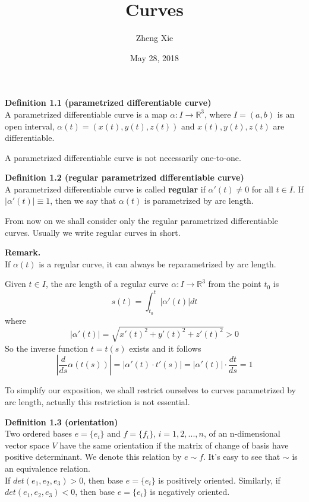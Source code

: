 \documentclass{article}
\author{Zheng Xie}
\title{Curves}
\date{May 28, 2018}
\begin{document}
\maketitle

\setlength\parindent{0em}   %
\setlength\parskip{1.0\baselineskip} %

\par
\textbf{Definition 1.1 (parametrized differentiable curve)}\\
A parametrized differentiable curve is a map $\alpha :I \to \mathbb R^3$, 
where $I = (a,b)$ is an open interval, $\alpha(t) = (x(t),y(t),z(t))$ and $x(t),y(t),z(t)$ are differentiable.

\par
A parametrized differentiable curve is not necessarily one-to-one.

\par
\textbf{Definition 1.2 (regular parametrized differentiable curve)}\\
A parametrized differentiable curve is called \textbf{regular} if $\alpha'(t) \neq 0$ for all $t \in I$.
If $|\alpha'(t)| \equiv 1$, then we say that $\alpha(t)$ is parametrized by arc length.

\par
From now on we shall consider only the regular parametrized differentiable curves.
Usually we write regular curves in short.

\par
\textbf{Remark.}\\
If $\alpha(t)$ is a regular curve, it can always be reparametrized by arc length.
\par
Given $t \in I$, the arc length of a regular curve $\alpha:I \to \mathbb R^3$ from the point $t_0$ is
$$
    s(t) = \int_{t_0}^t |{\alpha'(t)}|dt
$$
where
$$
    |{\alpha'(t)}| = \sqrt{x'(t)^2+y'(t)^2+z'(t)^2} > 0
$$
So the inverse function $t = t(s)$ exists and it follows
$$
    |\frac{d}{ds}\alpha(t(s))| = |\alpha'(t) \cdot t'(s)| = |\alpha'(t)| \cdot \frac{dt}{ds} = 1
$$

\par
To simplify our exposition, we shall restrict ourselves to curves parametrized by arc length, 
actually this restriction is not essential.

\par
\textbf{Definition 1.3 (orientation)}\\
Two ordered bases $e = \{e_i\}$ and $f = \{f_i\}$, $i=1,2,...,n$, of an n-dimensional vector space $V$ have the
same orientation if the matrix of change of basis have positive determinant. We denote this relation by $e \sim f$.
It's easy to see that $\sim$ is an equivalence relation.\\
If $det(e_1, e_2, e_3) > 0$, then base $e = \{e_i\}$ is positively oriented. Similarly, if $det(e_1, e_2, e_3) < 0$,
then base $e = \{e_i\}$ is negatively oriented.
\end{document}
